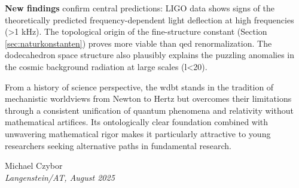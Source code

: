 \documentclass[11pt, a5paper, twoside, openright]{book}
\begin{document}
\textbf{New findings} confirm central predictions: LIGO data shows signs of the theoretically predicted frequency-dependent light deflection at high frequencies (>1 kHz). The topological origin of the fine-structure constant (Section \ref{sec:naturkonstanten}) proves more viable than \gls{qed} renormalization.
The dodecahedron space structure also plausibly explains the puzzling anomalies in the cosmic background radiation at large scales (l<20).

From a history of science perspective, the \gls{wdbt} stands in the tradition of mechanistic worldviews from Newton to Hertz but overcomes their limitations through a consistent unification
of quantum phenomena and relativity without mathematical artifices. Its ontologically clear foundation combined with unwavering mathematical rigor makes it particularly attractive to young
researchers seeking alternative paths in fundamental research.

\begin{flushright}
    Michael Czybor \\
    \emph{Langenstein/AT, August 2025}
\end{flushright}

\tableofcontents
\listoffigures
\listoftables

\mainmatter








\backmatter
\printbibliography[title=Bibliography]
\glswritefiles
\printglossary[title=Glossary]
\printglossary[type=acronym, title=Abbreviations]
\end{document}
